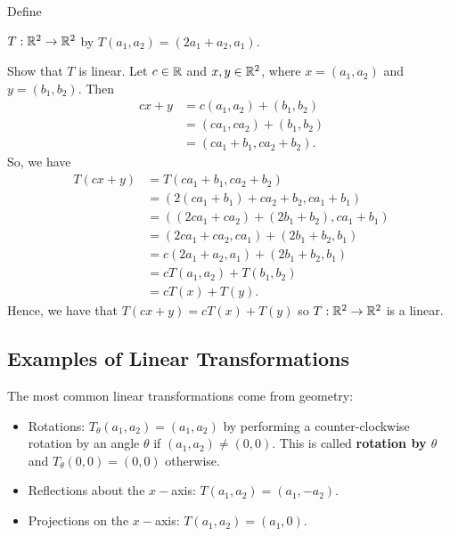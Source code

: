 \begin{eg}
   Define  
   \begin{center}
       \( T: \mathbb{R}^{2} \to \mathbb{R}^{2}  \) by \( T(a_{1}, a_{2}) = (2a_{1} + a_{2}, a_{1}) \).
   \end{center}
   Show that \( T  \) is linear. Let \( c \in \mathbb{R}  \) and \( x,y \in \mathbb{R}^{2} \), where \( x = (a_{1}, a_{2}) \) and \( y = (b_{1}, b_{2}) \). Then
   \begin{align*}
       cx + y &= c(a_{1}, a_{2}) + (b_{1}, b_{2})  \\
              &=  (ca_{1}, ca_{2} ) + (b_{1}, b_{2}) \\
              &=  (ca_{1} + b_{1} , ca_{2} + b_{2}).
   \end{align*}
   So, we have
   \begin{align*}
                                       T(cx + y)  &= T(ca_{1} + b_{1} , ca_{2} + b_{2})  \\
                                         &= (2(ca_{1} + b_{1})  + ca_{2} + b_{2}, ca_{1} + b_{1} ) \\
                                          &= ((2ca_{1} + ca_{2}) +  (2b_{1} + b_{2}), ca_{1} + b_{1}  ) \\
                                          &= (2ca_{1} + ca_{2}, ca_{1}) + (2b_{1} + b_{2}, b_{1} ) \\
                                          &= c(2a_{1} + a_{2}, a_{1}) + (2b_{1} + b_{2}, b_{1}) \\
                                          &= cT(a_{1}, a_{2}) + T(b_{1}, b_{2}) \\
                                          &= cT(x) + T(y).
   \end{align*}
   Hence, we have that \( T(cx + y) = cT(x) + T(y) \) so \( T: \mathbb{R}^{2} \to \mathbb{R}^{2}   \) is a linear.
\end{eg}

\subsection{Examples of Linear Transformations}

The most common linear transformations come from geometry:
\begin{itemize}
    \item Rotations: \( T_{\theta}(a_{1}, a_{2}) = (a_{1}, a_{2}) \) by performing a counter-clockwise rotation by an angle \( \theta \) if \( (a_{1}, a_{2}) \neq (0,0) \). This is called \textbf{rotation by \( \theta \)} and \( T_{\theta}(0,0) = (0,0) \) otherwise.
    \item Reflections about the \( x- \)axis: \( T(a_{1}, a_{2}) = (a_{1}, - a_{2}) \).
    \item Projections on the \( x- \)axis: \( T(a_{1}, a_{2}) = (a_{1}, 0 ) \).
\end{itemize}

